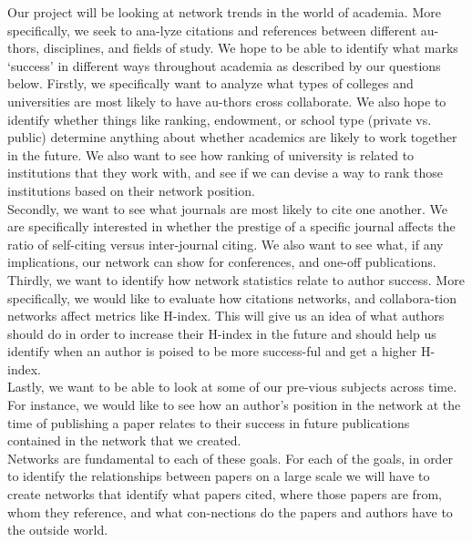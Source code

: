 \documentclass[times, 10pt,twocolumn]{article}
\begin{document}
Our project will be looking at network trends in the world of academia. More specifically, we seek to ana-lyze citations and references between different au-thors, disciplines, and fields of study. We hope to be able to identify what marks ‘success’ in different ways throughout academia as described by our questions below. 
Firstly, we specifically want to analyze what types of colleges and universities are most likely to have au-thors cross collaborate. We also hope to identify whether things like ranking, endowment, or school type (private vs. public) determine anything about whether academics are likely to work together in the future. We also want to see how ranking of university is related to institutions that they work with, and see if we can devise a way to rank those institutions based on their network position.\\
Secondly, we want to see what journals are most likely to cite one another. We are specifically interested in whether the prestige of a specific journal affects the ratio of self-citing versus inter-journal citing. We also want to see what, if any implications, our network can show for conferences, and one-off publications.\\
Thirdly, we want to identify how network statistics relate to author success. More specifically, we would like to evaluate how citations networks, and collabora-tion networks affect metrics like H-index. This will give us an idea of what authors should do in order to increase their H-index in the future and should help us identify when an author is poised to be more success-ful and get a higher H-index. \\
Lastly, we want to be able to look at some of our pre-vious subjects across time. For instance, we would like to see how an author’s position in the network at the time of publishing a paper relates to their success in future publications contained in the network that we created. \\
Networks are fundamental to each of these goals. For each of the goals, in order to identify the relationships between papers on a large scale we will have to create networks that identify what papers cited, where those papers are from, whom they reference, and what con-nections do the papers and authors have to the outside world.
\end{document}
